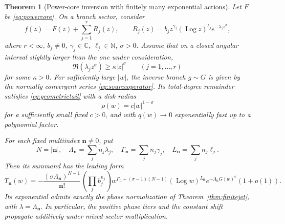 \documentclass[11pt,a4paper]{article}
\newtheorem{theorem}{Theorem}[section]
\theoremstyle{definition}
\theoremstyle{remark}
\newcommand{\C}{\mathbb C}
\newcommand{\N}{\mathbb N}
\newcommand{\Log}{\operatorname{Log}}
\newcommand{\nn}{\boldsymbol n}
\numberwithin{equation}{section}
\begin{document}
\begin{theorem}[Power-core inversion with finitely many exponential actions]\label{thm:finiteactions}
Let $F$ be \eqref{eq:powercore}. On a branch sector, consider
\begin{equation}\label{eq:finiteactionmodel}
 f(z)=F(z)+\sum_{j=1}^r R_j(z),\qquad
 R_j(z)=b_j z^{\gamma_j}(\Log z)^{\ell_j}e^{-\lambda_j z^\sigma},
\end{equation}
where $r<\infty$, $b_j\ne0$, $\gamma_j\in\C$, $\ell_j\in\N$, $\sigma>0$. Assume that on a closed angular interval slightly larger than the one under consideration,
\begin{equation}\label{eq:decaycone}
 \Re(\lambda_j z^\sigma)\ge\kappa|z|^\sigma
 \qquad(j=1,\ldots,r)
\end{equation}
for some $\kappa>0$. For sufficiently large $|w|$, the inverse branch $g\sim G$ is given by the normally convergent series \eqref{eq:sourceoperator}. Its total-degree remainder satisfies \eqref{eq:geometrictail} with a disk radius
\begin{equation}\label{eq:phaseradius}
 \rho(w)=c|w|^{1-\sigma}
\end{equation}
for a sufficiently small fixed $c>0$, and with $q(w)\to0$ exponentially fast up to a polynomial factor.

For each fixed multiindex $\nn\ne0$, put
\[
 N=|\nn|,\quad \Lambda_{\nn}=\sum_jn_j\lambda_j,
 \quad \Gamma_{\nn}=\sum_jn_j\gamma_j,
 \quad L_{\nn}=\sum_jn_j\ell_j.
\]
Then its summand has the leading form
\begin{equation}\label{eq:mixedleading}
 T_{\nn}(w)=
 -\frac{(\sigma\Lambda_{\nn})^{N-1}}{\nn!}
 \left(\prod_j b_j^{n_j}\right)
 w^{\Gamma_{\nn}+(\sigma-1)(N-1)}
 (\Log w)^{L_{\nn}}
 e^{-\Lambda_{\nn}G(w)^\sigma}(1+o(1)).
\end{equation}
Its exponential admits exactly the phase normalization of Theorem~\ref{thm:finitejet}, with $\lambda=\Lambda_{\nn}$. In particular, the positive phase tiers and the constant shift propagate additively under mixed-sector multiplication.
\end{theorem}
\end{document}
